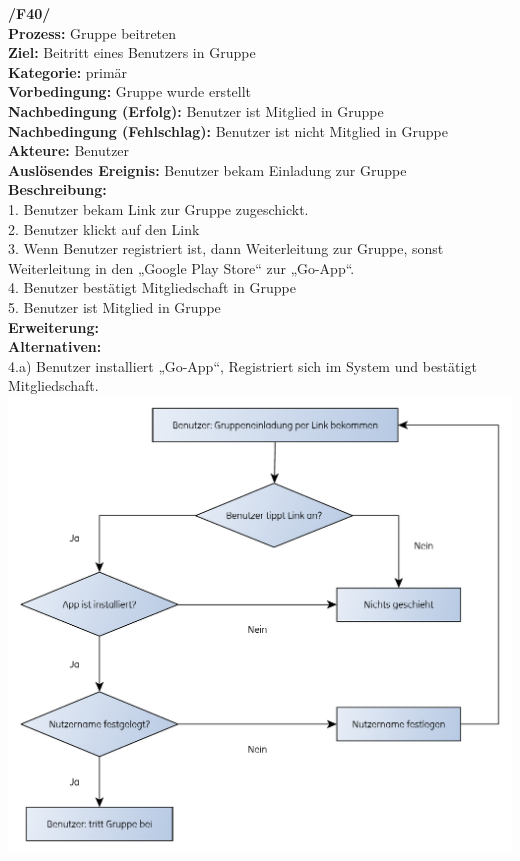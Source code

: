 \textbf{/F40/} \\
\textbf{Prozess:} Gruppe beitreten \\
\textbf{Ziel:} Beitritt eines Benutzers in Gruppe\\
\textbf{Kategorie:} primär \\
\textbf{Vorbedingung:} Gruppe wurde erstellt\\
\textbf{Nachbedingung (Erfolg):} Benutzer ist Mitglied in Gruppe\\
\textbf{Nachbedingung (Fehlschlag):} Benutzer ist nicht Mitglied in Gruppe\\
\textbf{Akteure:} Benutzer\\
\textbf{Auslösendes Ereignis:} Benutzer bekam Einladung zur Gruppe\\
\textbf{Beschreibung:} \\
1. Benutzer bekam Link zur Gruppe zugeschickt.\\
2. Benutzer klickt auf den Link \\
3. Wenn Benutzer registriert ist, dann Weiterleitung zur Gruppe, sonst Weiterleitung in den „Google Play Store“ zur „Go-App“.\\
4. Benutzer bestätigt Mitgliedschaft in Gruppe\\
5. Benutzer ist Mitglied in Gruppe\\
\textbf{Erweiterung:} \\
\textbf{Alternativen:} \\
4.a) Benutzer installiert „Go-App“, Registriert sich im System und bestätigt Mitgliedschaft.\\

\includegraphics[scale=0.8]{FXX_gruppe_beitreten_flowgraph.pdf}
